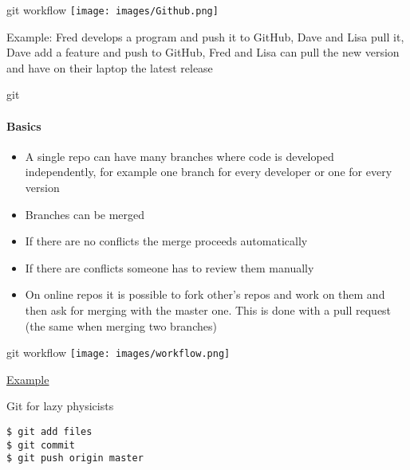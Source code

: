 \documentclass{beamer}
\begin{document}
\begin{frame}{git workflow}
  \centering
  \texttt{[image: images/Github.png]}

  Example: Fred develops a program and push it to GitHub,
  Dave and Lisa pull it, Dave add a feature and push to GitHub,
  Fred and Lisa can pull the new version and have on their laptop
  the latest release
\end{frame}

\begin{frame}{git}
  \framesubtitle{Basics}%
  \begin{itemize}
  \item A single repo can have many \alert{branches} where code is developed independently, for example one branch for every developer or one
    for every version
  \item Branches can be \alert{merged}
  \item If there are no conflicts the merge proceeds automatically
  \item If there are conflicts someone has to review them manually
  \item On online repos it is possible to \alert{fork} other's repos and work on them and then ask for merging with the master one. This is done with a \alert{pull request} (the same when merging two branches)
  \end{itemize}
\end{frame}

\begin{frame}{git workflow}
  \centering
  \texttt{[image: images/workflow.png]}

  \href{https://github.com/lcm-unimi/umanager/network}{Example}
\end{frame}

\begin{frame}[fragile]{Git for lazy physicists}
\verb|$ git add files| \\
\verb|$ git commit| \\
\verb|$ git push origin master|
\end{frame}
\end{document}
